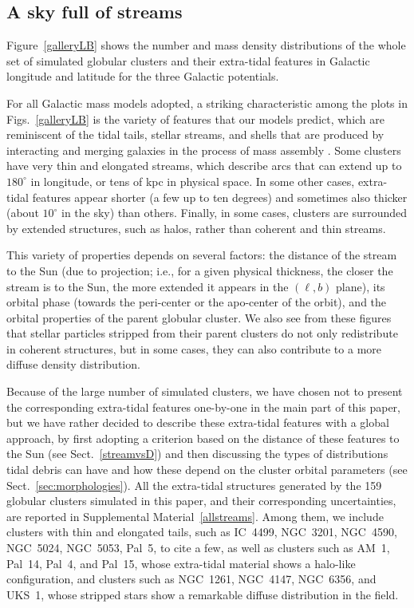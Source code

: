     \subsection{A sky full of streams}\label{results1}

    Figure~\ref{galleryLB} shows the number and mass density distributions of the whole set of simulated globular clusters and their extra-tidal features in Galactic longitude and latitude for the three Galactic potentials.

    For all Galactic mass models adopted, a striking characteristic among the plots in Figs.~\ref{galleryLB} is the variety of features that our models predict, which are reminiscent of the tidal tails, stellar streams, and shells that are produced by interacting and merging galaxies in the process of mass assembly \citep[see, e.g., ][]{2019A&A...632A.122M}. Some clusters have very thin and elongated streams, which describe arcs that can extend up to $180^\circ$ in longitude, or tens of kpc in physical space. In some other cases, extra-tidal features appear shorter (a few up to ten degrees) and sometimes also thicker (about $10^\circ$ in the sky) than others. Finally, in some cases, clusters are surrounded by extended structures, such as halos, rather than coherent and thin streams. 

    This variety of properties depends on several factors: the distance of the stream to the Sun (due to projection; i.e., for a given physical thickness, the closer the stream is to the Sun, the more extended it appears in the $(\ell, b)$ plane), its orbital phase (towards the peri-center or the apo-center of the orbit), and the orbital properties of the parent globular cluster. We also see from these figures that stellar particles stripped from their parent clusters do not only redistribute in coherent structures, but in some cases, they can also contribute to a more diffuse density distribution. 

    Because of the large number of simulated clusters, we have chosen not to present the corresponding extra-tidal features one-by-one in the main part of this paper, but we have rather decided to describe these extra-tidal features with a global approach, by first adopting a criterion based on the distance of these features to the Sun (see Sect.~\ref{streamvsD}) and then discussing the types of distributions tidal debris can have and how these depend on the cluster orbital parameters (see Sect.~\ref{sec:morphologies}). All the extra-tidal structures generated by the 159 globular clusters simulated in this paper, and their corresponding uncertainties, are reported in Supplemental Material~\ref{allstreams}. Among them, we include clusters with thin and elongated tails, such as IC~4499, NGC~3201, NGC~4590, NGC~5024, NGC~5053, Pal~5, to cite a few, as well as clusters such as AM~1, Pal~14, Pal~4, and Pal~15, whose extra-tidal material shows a halo-like configuration, and clusters such as NGC~1261, NGC~4147, NGC~6356, and UKS~1, whose stripped stars show a remarkable diffuse distribution in the field. 

